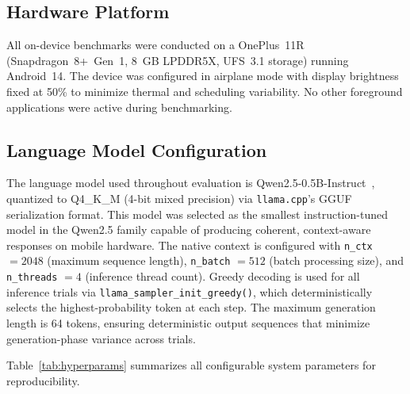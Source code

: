 \documentclass[journal]{IEEEtran}
\begin{document}
\subsection{Hardware Platform}
\label{sec:hardware}

All on-device benchmarks were conducted on a OnePlus~11R (Snapdragon~8+~Gen~1, 8~GB LPDDR5X, UFS~3.1 storage) running Android~14. The device was configured in airplane mode with display brightness fixed at 50\% to minimize thermal and scheduling variability. No other foreground applications were active during benchmarking.

\subsection{Language Model Configuration}
\label{sec:model_config}

The language model used throughout evaluation is Qwen2.5-0.5B-Instruct~\cite{qwen25}, quantized to Q4\_K\_M (4-bit mixed precision) via \texttt{llama.cpp}'s GGUF serialization format. This model was selected as the smallest instruction-tuned model in the Qwen2.5 family capable of producing coherent, context-aware responses on mobile hardware. The native context is configured with \texttt{n\_ctx} $= 2048$ (maximum sequence length), \texttt{n\_batch} $= 512$ (batch processing size), and \texttt{n\_threads} $= 4$ (inference thread count). Greedy decoding is used for all inference trials via \texttt{llama\_sampler\_init\_greedy()}, which deterministically selects the highest-probability token at each step. The maximum generation length is 64 tokens, ensuring deterministic output sequences that minimize generation-phase variance across trials.

Table~\ref{tab:hyperparams} summarizes all configurable system parameters for reproducibility.
\end{document}
